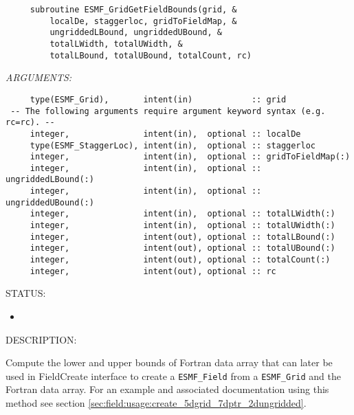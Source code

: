  
\begin{verbatim}     subroutine ESMF_GridGetFieldBounds(grid, &
         localDe, staggerloc, gridToFieldMap, &
         ungriddedLBound, ungriddedUBound, &
         totalLWidth, totalUWidth, &
         totalLBound, totalUBound, totalCount, rc)
     \end{verbatim}{\em ARGUMENTS:}
\begin{verbatim}     type(ESMF_Grid),       intent(in)            :: grid     
 -- The following arguments require argument keyword syntax (e.g. rc=rc). --
     integer,               intent(in),  optional :: localDe
     type(ESMF_StaggerLoc), intent(in),  optional :: staggerloc 
     integer,               intent(in),  optional :: gridToFieldMap(:)    
     integer,               intent(in),  optional :: ungriddedLBound(:)
     integer,               intent(in),  optional :: ungriddedUBound(:)
     integer,               intent(in),  optional :: totalLWidth(:)
     integer,               intent(in),  optional :: totalUWidth(:)
     integer,               intent(out), optional :: totalLBound(:)
     integer,               intent(out), optional :: totalUBound(:)
     integer,               intent(out), optional :: totalCount(:)
     integer,               intent(out), optional :: rc     
 \end{verbatim}
{\sf STATUS:}
   \begin{itemize}
   \item{}
   \end{itemize}
  
{\sf DESCRIPTION:\\ }


   Compute the lower and upper bounds of Fortran data array that can later
   be used in FieldCreate interface to create a {\tt ESMF\_Field} from a
   {\tt ESMF\_Grid} and the Fortran data array. For an example and
   associated documentation using this method see section 
   \ref{sec:field:usage:create_5dgrid_7dptr_2dungridded}.
  
